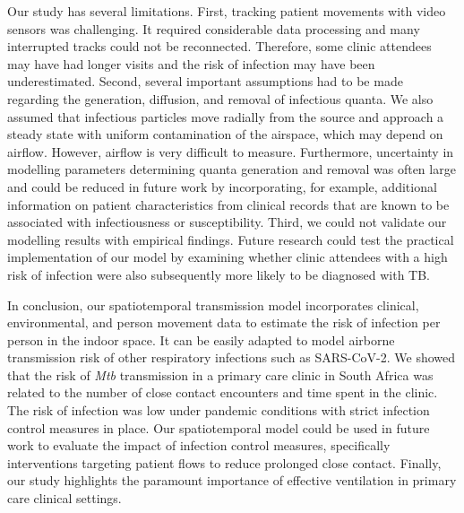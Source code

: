 \documentclass[fleqn,11pt]{wlscirep}
\begin{document}
Our study has several limitations. First, tracking patient movements with video sensors was challenging. It required considerable data processing and many interrupted tracks could not be reconnected. Therefore, some clinic attendees may have had longer visits and the risk of infection may have been underestimated. Second, several important assumptions had to be made regarding the generation, diffusion, and removal of infectious quanta.  We also assumed that infectious particles move radially from the source and approach a steady state with uniform contamination of the airspace, which may depend on airflow. However, airflow is very difficult to measure. Furthermore, uncertainty in modelling parameters determining quanta generation and removal was often large and could be reduced in future work by incorporating, for example, additional information on patient characteristics from clinical records that are known to be associated with infectiousness\cite{Escombe2008PLoSMed} or susceptibility\cite{Furin2019Lancet}. Third,  we could not validate our modelling results with empirical findings. Future research could test the practical implementation of our model by examining whether clinic attendees with a high risk of infection were also subsequently more likely to be diagnosed with TB.  

In conclusion, our spatiotemporal transmission model incorporates clinical, environmental, and person movement data to estimate the risk of infection per person in the indoor space. It can be easily adapted to model airborne transmission risk of other respiratory infections such as SARS-CoV-2. We showed that the risk of \emph{Mtb} transmission in a primary care clinic in South Africa was related to the number of close contact encounters and time spent in the clinic. The risk of infection was low under pandemic conditions with strict infection control measures in place. Our spatiotemporal model could be used in future work to evaluate the impact of infection control measures, specifically interventions targeting patient flows to reduce prolonged close contact. Finally, our study highlights the paramount importance of effective ventilation in primary care clinical settings. 
\end{document}
